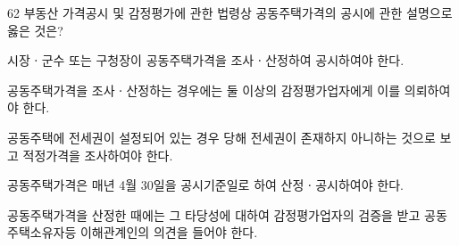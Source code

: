 \begin{question}{62}
부동산 가격공시 및 감정평가에 관한 법령상 공동주택가격의 공시에 관한 설명으로 옳은 것은?
\begin{choices}
  \item 시장ㆍ군수 또는 구청장이 공동주택가격을 조사ㆍ산정하여 공시하여야 한다.
  \item 공동주택가격을 조사ㆍ산정하는 경우에는 둘 이상의 감정평가업자에게 이를 의뢰하여야 한다.
  \item 공동주택에 전세권이 설정되어 있는 경우 당해 전세권이 존재하지 아니하는 것으로 보고 적정가격을 조사하여야 한다.
  \item 공동주택가격은 매년 4월 30일을 공시기준일로 하여 산정ㆍ공시하여야 한다.
  \item 공동주택가격을 산정한 때에는 그 타당성에 대하여 감정평가업자의 검증을 받고 공동주택소유자등 이해관계인의 의견을 들어야 한다.
\end{choices}
\end{question}
